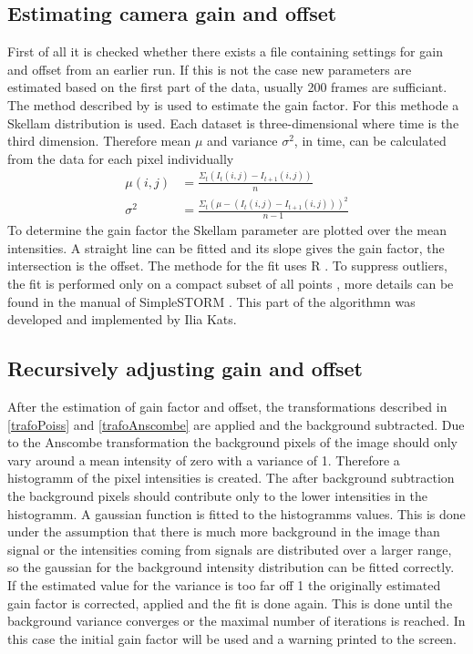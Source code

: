 \subsection{Estimating camera gain and offset}
First of all it is checked whether there exists a file containing settings for gain and offset from an earlier run. If this is not the case new parameters are estimated based on the first part of the data, usually 200 frames are sufficiant.\newline
The method described by \cite{skellam} is used to estimate the
gain factor. For this methode a Skellam distribution is used. 
Each dataset is three-dimensional where time is the third
dimension. Therefore mean $\mu$ and variance $\sigma^2$, in time, can be calculated from
the data for each pixel individually
\begin{align}
	\mu(i,j) & = \frac{\Sigma_t(I_t(i,j)-I_{t+1}(i,j))}{n}\\
	\sigma^2 & = \frac{\Sigma_t(\mu-(I_t(i,j)-I_{t+1}(i,j)))^2}{n-1}
\end{align} 
To determine the gain factor the Skellam parameter are plotted over the mean
intensities. A straight line can be fitted and its slope gives the gain
factor, the intersection is the offset.\newline 
The methode for the fit uses R \cite{Rcite}. To suppress outliers, the fit is performed only on a compact subset of all points \cite{ilia1}, more details can be found in the manual of SimpleSTORM \cite{ilia2}. This part of the algorithmn was developed and implemented by Ilia Kats.  
\subsection{Recursively adjusting gain and offset}
After the estimation of gain factor and offset, the transformations described in \ref{trafoPoiss} and \ref{trafoAnscombe} are applied and the background subtracted.\newline
Due to the Anscombe transformation the background pixels of the image should only vary around a mean intensity of zero with a variance of 1. Therefore a histogramm of the pixel intensities is created. The after background subtraction the background pixels should contribute only to the lower intensities in the histogramm. A gaussian function is fitted to the histogramms values. This is done under the assumption that there is much more background in the image than signal or the intensities coming from signals are distributed over a larger range, so the gaussian for the background intensity distribution can be fitted correctly.\newline
If the estimated value for the variance is too far off 1 the originally estimated gain factor is corrected, applied and the fit is done again. This is done until the background variance converges or the maximal number of iterations is reached. In this case the initial gain factor will be used and a warning printed to the screen.
